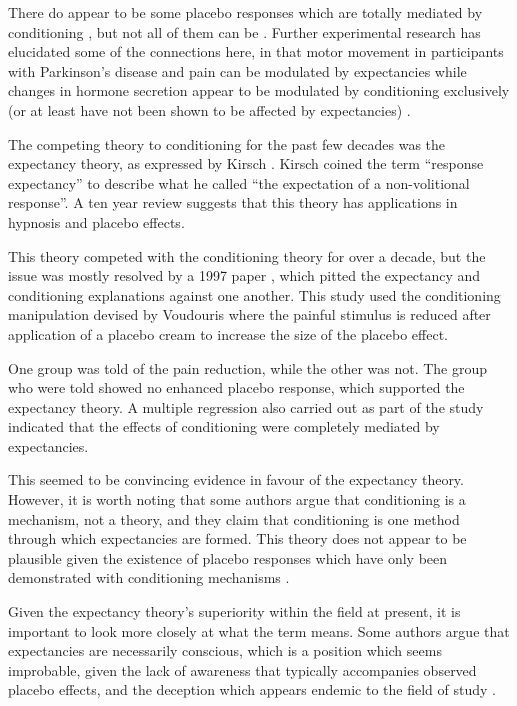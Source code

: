 There do appear to be some placebo responses which are totally mediated by conditioning \cite{Amanzio1999}, but not all of them can be \cite{Benedetti2003a}. Further experimental research has elucidated some of the connections here, in that motor movement in participants with Parkinson's disease and pain can be modulated by expectancies while changes in hormone secretion appear to be modulated by conditioning exclusively (or at least have not been shown to be affected by expectancies) \cite{Benedetti2003a}.

The competing theory to conditioning for the past few decades was the expectancy theory, as expressed by Kirsch \cite{Kirsch1985}. Kirsch coined the term ``response expectancy'' to describe what he called ``the expectation of a non-volitional response''. A ten year review \cite{Kirsch1997}  suggests that this theory has applications in hypnosis and placebo effects. 

This theory competed with the conditioning theory for over a decade, but the issue was mostly resolved by a 1997 paper \cite{Montgomery1997}, which pitted the expectancy and conditioning explanations against one another. This study used the conditioning manipulation devised by Voudouris \cite{Voudouris1985} where the painful stimulus is reduced after application of a placebo cream to increase the size of the placebo effect. 

One group was told of the pain reduction, while the other was not. The group who were told showed no enhanced placebo response, which supported the expectancy theory. A multiple regression also carried out as part of the study indicated that the effects of conditioning were completely mediated by expectancies. 

This seemed to be convincing evidence in favour of the expectancy theory. However, it is worth noting that some authors \cite{Stewart-Williams2004a}  argue that conditioning is a mechanism, not a theory, and they claim that conditioning is one method through which expectancies are formed. This theory does not appear to be plausible given the existence of placebo responses which have only been demonstrated with conditioning mechanisms \cite{Benedetti2003a}.   

Given the expectancy theory's superiority within the field at present, it is important to look more closely at what the term means. Some authors \cite{Stewart-Williams2004a}  argue that expectancies are necessarily conscious, which is a position which seems improbable, given the lack of awareness that typically accompanies observed placebo effects, and the deception which appears endemic to the field of study \cite{Miller2008a,Miller2008}.  

